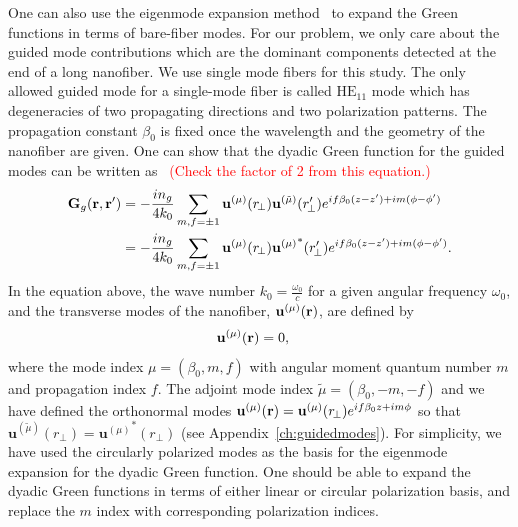 \documentclass[preprint,aps,pra,onecolumn]{revtex4-1} %
\begin{document}
One can also use the eigenmode expansion method~\cite{Glauber1991,Sondergaard2001a} to expand the Green functions in terms of bare-fiber modes. For our problem, we only care about the guided mode contributions which are the dominant components detected at the end of a long nanofiber. We use single mode fibers for this study. The only allowed guided mode for a single-mode fiber is called \textit{$\mathrm{HE}_{11}$} mode which has degeneracies of two propagating directions and two polarization patterns. The propagation constant $\beta_0$ is fixed once the wavelength and the geometry of the nanofiber are given. One can show that the dyadic Green function for the guided modes can be written as~\cite{Sondergaard2001a} \textcolor{red}{(Check the factor of 2 from this equation.)}
\begin{align}
\mathbf{G}_g(\mathbf{r},\mathbf{r}') &=-\frac{in_g}{4k_0} \sum_{m,f=\pm 1} \mathbf{u}^{(\mu)}(r\!_\perp)\mathbf{u}^{(\tilde{\mu})}(r_{\!\perp}^\prime)e^{if\beta_0(z-z')+im(\phi-\phi')}\\
&= -\frac{in_g}{4k_0} \sum_{m,f=\pm 1} \mathbf{u}^{(\mu)}(r\!_\perp){\mathbf{u}^{(\mu)}}^*(r_{\!\perp}^\prime)e^{if\beta_0(z-z')+im(\phi-\phi')}.
\end{align}
In the equation above, the wave number $k_0=\frac{\omega_0}{c}$ for a given angular frequency $\omega_0$, and the transverse modes of the nanofiber, $\mathbf{u}^{(\mu)}(\mathbf{r})$, are defined by
\begin{align}
[-\nabla\times\nabla + \frac{\omega_0^2}{c^2}n^2(\br)]  \mathbf{u}^{(\mu)}(\br) &=0,
\end{align}
where the mode index $\mu=(\beta_0,m,f)$ with angular moment quantum number $ m $ and propagation index $ f $. The adjoint mode index $\tilde{\mu}=(\beta_0,-m,-f)$ and we have defined the orthonormal modes $\mathbf{u}^{(\mu)}(\mathbf{r})=\mathbf{u}^{(\mu)}(r_{\!\perp})e^{if\beta_0z+im\phi}$ so that $\mathbf{u}^{(\tilde{\mu})}(r_{\!\perp})={\mathbf{u}^{(\mu)}}^*(r_{\!\perp})$ (see Appendix~\ref{ch:guidedmodes}). For simplicity, we have used the circularly polarized modes as the basis for the eigenmode expansion for the dyadic Green function. One should be able to expand the dyadic Green functions in terms of either linear or circular polarization basis, and replace the $m$ index with corresponding polarization indices. 
\end{document}
